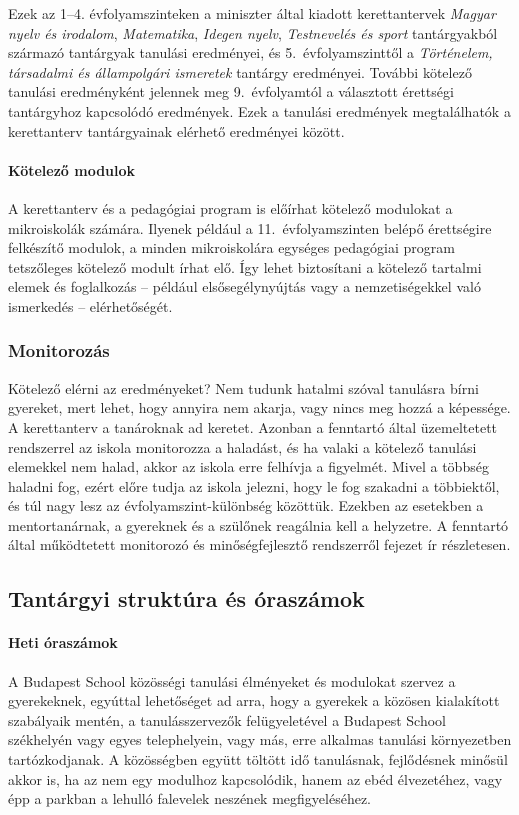 Ezek az 1--4. évfolyamszinteken a miniszter által kiadott kerettantervek \emph{Magyar nyelv és irodalom}, \emph{Matematika}, \emph{Idegen nyelv}, \emph{Testnevelés és sport} tantárgyakból származó tantárgyak tanulási eredményei, és 5.~évfolyamszinttől a \emph{Történelem, társadalmi és állampolgári ismeretek} tantárgy eredményei. További kötelező tanulási eredményként jelennek meg 9.~évfolyamtól a választott érettségi tantárgyhoz kapcsolódó eredmények. Ezek a tanulási eredmények megtalálhatók a kerettanterv tantárgyainak elérhető eredményei között.

\paragraph{Kötelező modulok}
A kerettanterv és a pedagógiai program is előírhat kötelező modulokat a mikroiskolák számára. Ilyenek például a 11.~évfolyamszinten belépő érettségire felkészítő modulok, a minden mikroiskolára egységes pedagógiai program tetszőleges kötelező modult írhat elő. Így lehet biztosítani a kötelező tartalmi elemek és foglalkozás -- például elsősegélynyújtás vagy a nemzetiségekkel való ismerkedés -- elérhetőségét.

\subsubsection{Monitorozás}

Kötelező elérni az eredményeket? Nem tudunk hatalmi szóval tanulásra bírni gyereket, mert lehet, hogy annyira nem akarja, vagy nincs meg hozzá a képessége. A kerettanterv a tanároknak ad keretet. Azonban a fenntartó által üzemeltetett rendszerrel az iskola  monitorozza a haladást, és ha valaki a kötelező tanulási elemekkel nem halad, akkor az iskola erre felhívja a figyelmét. Mivel a többség haladni fog, ezért előre tudja az iskola jelezni, hogy le fog szakadni a többiektől, és túl nagy lesz az évfolyamszint-különbség közöttük. Ezekben az esetekben a mentortanárnak, a gyereknek és a szülőnek reagálnia kell a helyzetre. A fenntartó által működtetett monitorozó és minőségfejlesztő rendszerről  fejezet ír részletesen.


\subsection{Tantárgyi struktúra és óraszámok}
\label{sec:tantargyi_struktura}
\paragraph{Heti óraszámok} 
A Budapest School közösségi tanulási élményeket és\linebreak
modulokat szervez a gyerekeknek, egyúttal lehetőséget ad arra, hogy a gyerekek a közösen kialakított szabályaik mentén, a tanulásszervezők felügyeletével a Budapest School székhelyén vagy egyes telephelyein, vagy más, erre alkalmas tanulási környezetben tartózkodjanak. A közösségben együtt töltött idő tanulásnak, fejlődésnek minősül akkor is, ha az nem egy modulhoz kapcsolódik, hanem az ebéd élvezetéhez, vagy épp a parkban a lehulló falevelek neszének megfigyeléséhez.

